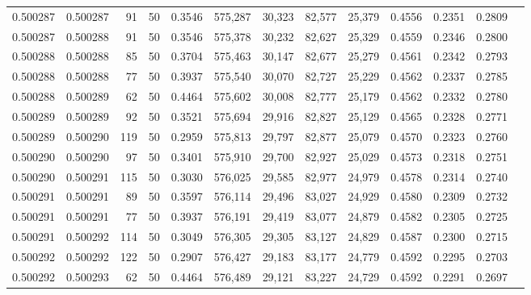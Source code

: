 \begin{tabular}{rrrrrrrrrrrrr}
0.500287 & 0.500287 &    91 &  50 &                                     0.3546 & 575,287 &  30,323 &  82,577 &  25,379 & 0.4556 & 0.2351 & 0.2809 \\
0.500287 & 0.500288 &    91 &  50 &                                     0.3546 & 575,378 &  30,232 &  82,627 &  25,329 & 0.4559 & 0.2346 & 0.2800 \\
0.500288 & 0.500288 &    85 &  50 &                                     0.3704 & 575,463 &  30,147 &  82,677 &  25,279 & 0.4561 & 0.2342 & 0.2793 \\
0.500288 & 0.500288 &    77 &  50 &                                     0.3937 & 575,540 &  30,070 &  82,727 &  25,229 & 0.4562 & 0.2337 & 0.2785 \\
0.500288 & 0.500289 &    62 &  50 &                                     0.4464 & 575,602 &  30,008 &  82,777 &  25,179 & 0.4562 & 0.2332 & 0.2780 \\
0.500289 & 0.500289 &    92 &  50 &                                     0.3521 & 575,694 &  29,916 &  82,827 &  25,129 & 0.4565 & 0.2328 & 0.2771 \\
0.500289 & 0.500290 &   119 &  50 &                                     0.2959 & 575,813 &  29,797 &  82,877 &  25,079 & 0.4570 & 0.2323 & 0.2760 \\
0.500290 & 0.500290 &    97 &  50 &                                     0.3401 & 575,910 &  29,700 &  82,927 &  25,029 & 0.4573 & 0.2318 & 0.2751 \\
0.500290 & 0.500291 &   115 &  50 &                                     0.3030 & 576,025 &  29,585 &  82,977 &  24,979 & 0.4578 & 0.2314 & 0.2740 \\
0.500291 & 0.500291 &    89 &  50 &                                     0.3597 & 576,114 &  29,496 &  83,027 &  24,929 & 0.4580 & 0.2309 & 0.2732 \\
0.500291 & 0.500291 &    77 &  50 &                                     0.3937 & 576,191 &  29,419 &  83,077 &  24,879 & 0.4582 & 0.2305 & 0.2725 \\
0.500291 & 0.500292 &   114 &  50 &                                     0.3049 & 576,305 &  29,305 &  83,127 &  24,829 & 0.4587 & 0.2300 & 0.2715 \\
0.500292 & 0.500292 &   122 &  50 &                                     0.2907 & 576,427 &  29,183 &  83,177 &  24,779 & 0.4592 & 0.2295 & 0.2703 \\
0.500292 & 0.500293 &    62 &  50 &                                     0.4464 & 576,489 &  29,121 &  83,227 &  24,729 & 0.4592 & 0.2291 & 0.2697 \\

\end{tabular}
